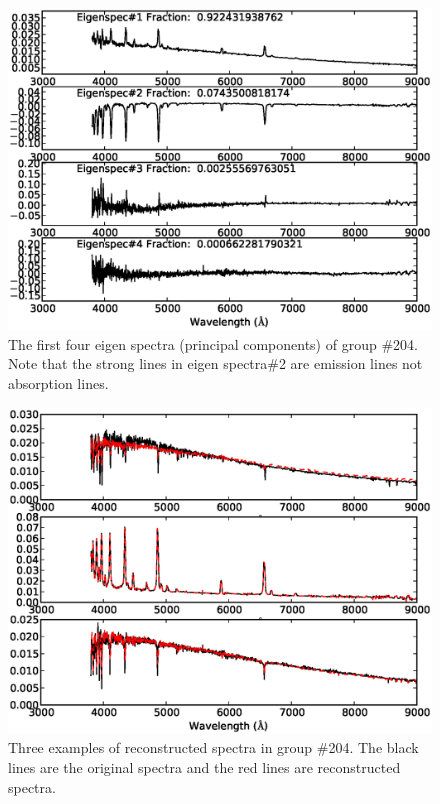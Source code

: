 \documentclass[manuscript]{aastex}
\begin{document}
\begin{figure}
   \centering
   \includegraphics[width=14cm, angle=0,clip]{f73.eps}
   \caption{The first four eigen spectra (principal components) of group \#204.
    Note that the strong lines in eigen spectra\#2 are emission lines not absorption lines.
   }
   \label{Fig73}
\end{figure}

 \begin{figure}
   \centering
   \includegraphics[width=14cm, angle=0,clip]{f83.eps}
   \caption{Three examples of reconstructed spectra in group \#204.
The black lines are the original spectra and the red lines are reconstructed spectra.
   }
   \label{Fig83}
\end{figure}
\end{document}
